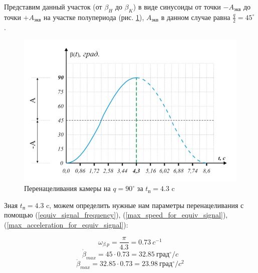 Представим данный участок (от $\beta_{H}$ до $\beta_{K}$) в виде синусоиды от точки
$-A_\text{экв}$ до точки $+A_\text{экв}$ на участке полупериода
(рис. \ref{retarget_90grad_4,3sec}), $A_\text{экв}$ в данном случае
равна $\frac{q}{2} = 45^{\circ}$.

\begin{figure}[h!]
    \centering
    \includegraphics[keepaspectratio]{./src/pictures/retarget_equivalent_input_signals/90grad_4,3sec}
    \caption{Перенацеливания камеры на $q = 90^{\circ}$ за $t_\text{п} = 4.3$ c}
    \label{retarget_90grad_4,3sec}
\end{figure}

Зная $t_{\text{п} } = 4.3$ c, можем определить нужные нам параметры перенацеливания
с помощью (\ref{equiv_signal_frequency}),
(\ref{max_speed_for_equiv_signal}),
(\ref{max_acceleration_for_equiv_signal}):

$$
    \omega_{\beta.p} = \frac{\pi}{4.3} = 0.73 ~c^{-1}
$$
$$
    \dot{\beta}_{max} = 45 \cdot 0.73 = 32.85 ~\text{град}^{\circ} / c
$$
$$
    \ddot{\beta}_{max} = 32.85 \cdot 0.73 = 23.98 ~\text{град}^{\circ} / c^{2}
$$
\endinput

